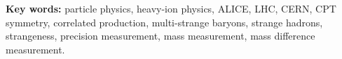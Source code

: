 \noindent\textbf{Key words:} particle physics, heavy-ion physics, ALICE, LHC, CERN, CPT symmetry, correlated production, multi-strange baryons, strange hadrons, strangeness, precision measurement, mass measurement, mass difference measurement.

%
%
%
